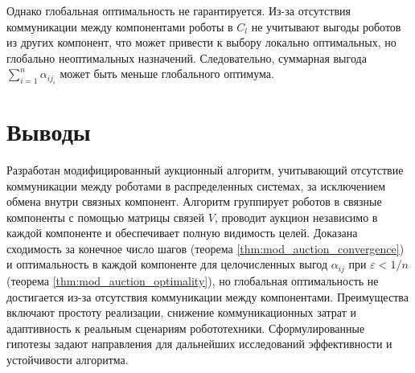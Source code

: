 Однако глобальная оптимальность не гарантируется. Из-за отсутствия коммуникации между компонентами роботы в \( C_l \) не учитывают выгоды роботов из других компонент, что может привести к выбору локально оптимальных, но глобально неоптимальных назначений. Следовательно, суммарная выгода \( \sum_{i=1}^n \alpha_{i j_i} \) может быть меньше глобального оптимума.


\section{Выводы}

Разработан модифицированный аукционный алгоритм, учитывающий отсутствие коммуникации между роботами в распределенных системах, за исключением обмена внутри связных компонент. Алгоритм группирует роботов в связные компоненты с помощью матрицы связей \( V \), проводит аукцион независимо в каждой компоненте и обеспечивает полную видимость целей. Доказана сходимость за конечное число шагов (теорема \ref{thm:mod_auction_convergence}) и оптимальность в каждой компоненте для целочисленных выгод \( \alpha_{ij} \) при \( \varepsilon < 1/n \) (теорема \ref{thm:mod_auction_optimality}), но глобальная оптимальность не достигается из-за отсутствия коммуникации между компонентами. Преимущества включают простоту реализации, снижение коммуникационных затрат и адаптивность к реальным сценариям робототехники. Сформулированные гипотезы задают направления для дальнейших исследований эффективности и устойчивости алгоритма.